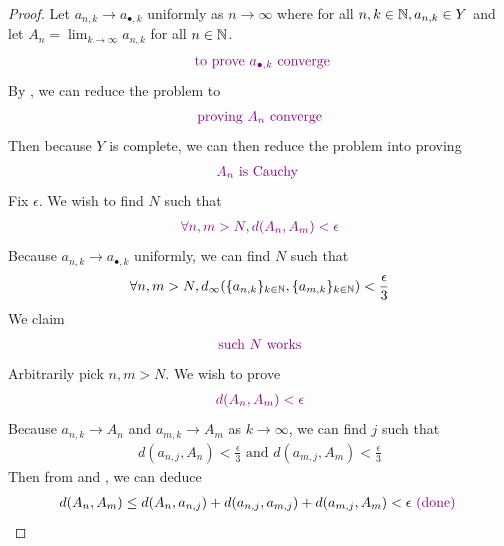 \documentclass{report}
\begin{document}
\begin{proof}
Let $a_{n,k}\to a_{\bullet,k}$ uniformly as $n\to \infty$ where for all $n,k \in\mathbb{N}, a_{n,k}\in Y$ and let $A_n= \lim_{k\to \infty}a_{n,k}$ for all $n\in\mathbb{N}$.  
\begin{align*}
  \textcolor{violet}{\text{ to prove $a_{\bullet,k}$ converge}}
\end{align*}
By , we can reduce the problem to 
\begin{align*}
\textcolor{violet}{\text{ proving $A_n$ converge }}
\end{align*}
Then because $Y$ is complete, we can then reduce the problem into proving 
\begin{align*}
  \textcolor{violet}{A_n\text{ is Cauchy }}
\end{align*}
Fix $\epsilon $. We wish to find $N$ such that 
 \begin{align*}
   \textcolor{violet}{\forall n,m>N, d(A_n,A_m)<\epsilon }
\end{align*}
Because $a_{n,k}\to a_{\bullet,k}$ uniformly, we can find $N$ such that  
 \begin{align}
\label{K10}
\forall n,m> N, d_\infty(\{ a_{n,k} \}_{k\in\mathbb{N}},\{ a_{m,k} \}_{k\in\mathbb{N}})<\frac{\epsilon}{3} 
\end{align}
We claim 
\begin{align*}
\textcolor{violet}{\text{ such $N$ works }}
\end{align*}
Arbitrarily pick $n,m>N$. We wish to prove 
\begin{align*}
\textcolor{violet}{d(A_n,A_m)<\epsilon }
\end{align*}
Because $a_{n,k} \to A_n$ and $a_{m,k}\to A_m$ as $k \to \infty$, we can find $j$ such that  
\begin{align}
\label{K11}
d(a_{n,j},A_n)<\frac{\epsilon}{3}\text{ and }d(a_{m,j},A_m)<\frac{\epsilon}{3}
\end{align}
Then from   and , we can deduce
\begin{align*}
d(A_n,A_m)\leq d(A_n,a_{n,j})+d(a_{n,j},a_{m,j})+d(a_{m,j},A_m)<\epsilon \textcolor{violet}{\text{ (done) }}
\end{align*}
\end{proof}
\end{document}
